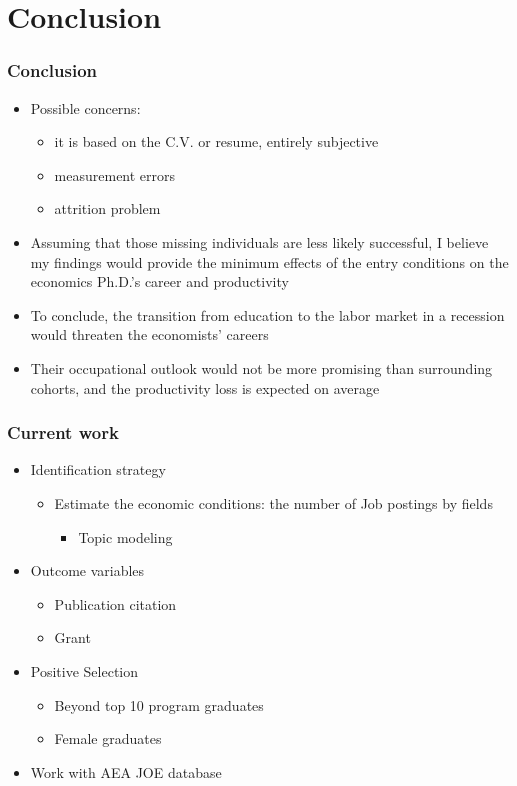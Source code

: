 \documentclass[10pt,svgnames,fragile]{beamer}
\begin{document}
{
	\AtBeginSection{}

\section{Conclusion}
\begin{frame}
	\frametitle{Conclusion}
	\begin{itemize}
		\item Possible concerns:
		\begin{itemize}
			\item it is based on the C.V. or resume, entirely subjective
			\vspace{1 mm}
			\item measurement errors
			\vspace{1 mm}
			\item attrition problem
		\end{itemize}
	\vfill
		\item Assuming that those missing individuals are less likely successful, I believe my findings would provide 	the minimum effects of the entry conditions on the economics Ph.D.'s career and productivity
		\vfill
		\item To conclude, the transition from education to the labor market in a recession would threaten the economists' careers
		\vfill
		\item Their occupational outlook would not be more 		promising than surrounding cohorts, and the productivity loss is expected on average
\vfill	
\end{itemize}
\end{frame}





\begin{frame}
	\frametitle{Current work}
	\begin{itemize}
		\item Identification strategy
			\vfill
		\begin{itemize}
			\item Estimate the economic conditions: the number of Job postings by fields 
				\vfill
			\begin{itemize}
				\item Topic modeling
			\end{itemize}
				\vfill
		\end{itemize}
		\item Outcome variables 
			\vfill
			\begin{itemize}
			\item Publication citation
				\vfill
			\item Grant
				\vfill
		\end{itemize}		
		\item Positive Selection 
			\vfill
		\begin{itemize}
			\item Beyond top 10 program graduates
				\vfill
			\item Female graduates
		\end{itemize}
		\vfill
		\item Work with AEA JOE database
		\vfill
	\end{itemize}
\end{frame}
}
\end{document}
